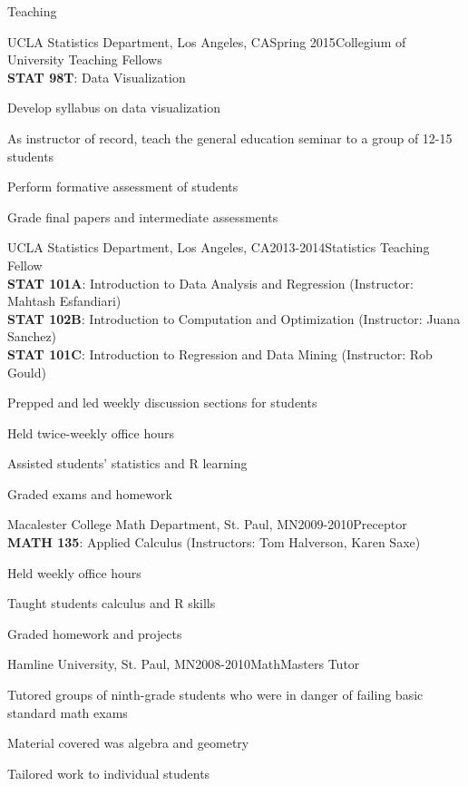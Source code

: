 \documentclass{resume} %
\begin{document}
\clearpage
\begin{rSection}{Teaching}
\begin{rSubsection}{UCLA Statistics Department, }{Los Angeles, CA}{Spring 2015}{Collegium of University Teaching Fellows
\\ \textbf{STAT 98T}: Data Visualization}
\item Develop syllabus on data visualization
\item As instructor of record, teach the general education seminar to a group of 12-15 students
\item Perform formative assessment of students
\item Grade final papers and intermediate assessments
\end{rSubsection}


\begin{rSubsection}{UCLA Statistics Department, }{Los Angeles, CA}{2013-2014}{Statistics Teaching Fellow
\\ \textbf{STAT 101A}: Introduction to Data Analysis and Regression (Instructor: Mahtash Esfandiari)
\\ \textbf{STAT 102B}: Introduction to Computation and Optimization (Instructor: Juana Sanchez)
\\ \textbf{STAT 101C}: Introduction to Regression and Data Mining (Instructor: Rob Gould)}
\item Prepped and led weekly discussion sections for students
\item Held twice-weekly office hours
\item Assisted students' statistics and R learning
\item Graded exams and homework
\end{rSubsection}

\begin{rSubsection}{Macalester College Math Department, }{St. Paul, MN}{2009-2010}{Preceptor
\\ \textbf{MATH 135}: Applied Calculus (Instructors: Tom Halverson, Karen Saxe)}
\item Held weekly office hours
\item Taught students calculus and R skills
\item Graded homework and projects
\end{rSubsection}

\begin{rSubsection}{Hamline University, }{St. Paul, MN}{2008-2010}{MathMasters Tutor}
\item Tutored groups of ninth-grade students who were in danger of failing basic standard math exams
\item Material covered was algebra and geometry
\item Tailored work to individual students
\end{rSubsection}


\end{rSection}
\end{document}
